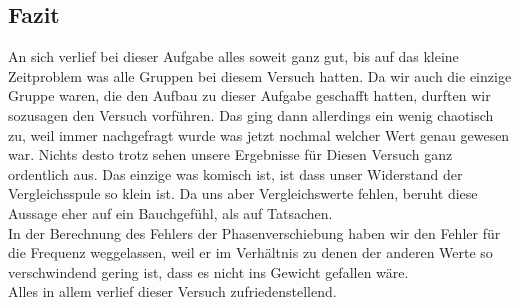 \subsection*{Fazit}
An sich verlief bei dieser Aufgabe alles soweit ganz gut, bis auf das kleine Zeitproblem was alle Gruppen bei diesem Versuch hatten. Da wir auch die einzige Gruppe waren, die den Aufbau zu dieser Aufgabe geschafft hatten, durften wir sozusagen den Versuch vorführen. Das ging dann allerdings ein wenig chaotisch zu, weil immer nachgefragt wurde was jetzt nochmal welcher Wert genau gewesen war. Nichts desto trotz sehen unsere Ergebnisse für Diesen Versuch ganz ordentlich aus. Das einzige was komisch ist, ist dass unser Widerstand der Vergleichsspule so klein ist. Da uns aber Vergleichswerte fehlen, beruht diese Aussage eher auf ein Bauchgefühl, als auf Tatsachen.\\
In der Berechnung des Fehlers der Phasenverschiebung haben wir den Fehler für die Frequenz weggelassen, weil er im Verhältnis zu denen der anderen Werte so verschwindend gering ist, dass es nicht ins Gewicht gefallen wäre.\\
Alles in allem verlief dieser Versuch zufriedenstellend.